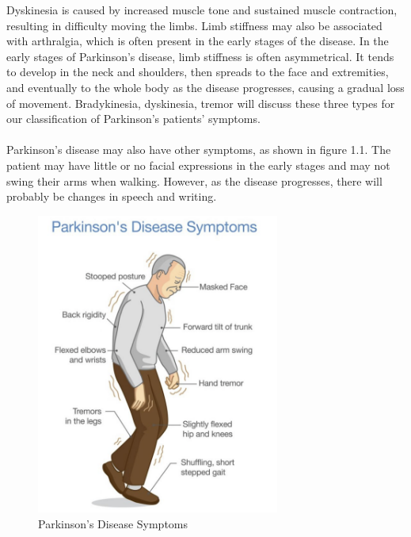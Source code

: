 Dyskinesia is caused by increased muscle tone and sustained muscle contraction, resulting in difficulty moving the limbs. Limb stiffness may also be associated with arthralgia, which is often present in the early stages of the disease. In the early stages of Parkinson's disease, limb stiffness is often asymmetrical. It tends to develop in the neck and shoulders, then spreads to the face and extremities, and eventually to the whole body as the disease progresses, causing a gradual loss of movement.\cite{jankovic2008parkinson}  Bradykinesia, dyskinesia, tremor will discuss these three types for our classification of Parkinson's patients' symptoms. 
\\ \hspace*{\fill} \\
Parkinson's disease may also have other symptoms, as shown in figure 1.1. The patient may have little or no facial expressions in the early stages and may not swing their arms when walking. However, as the disease progresses, there will probably be changes in speech and writing.



\begin{figure}[htbp]
\centering
\includegraphics[width=8cm ]{slides-tex/pics/Parkinson's Disease Symptoms.png}
\caption{Parkinson's Disease Symptoms \cite{Symptoms}}
\end{figure}


